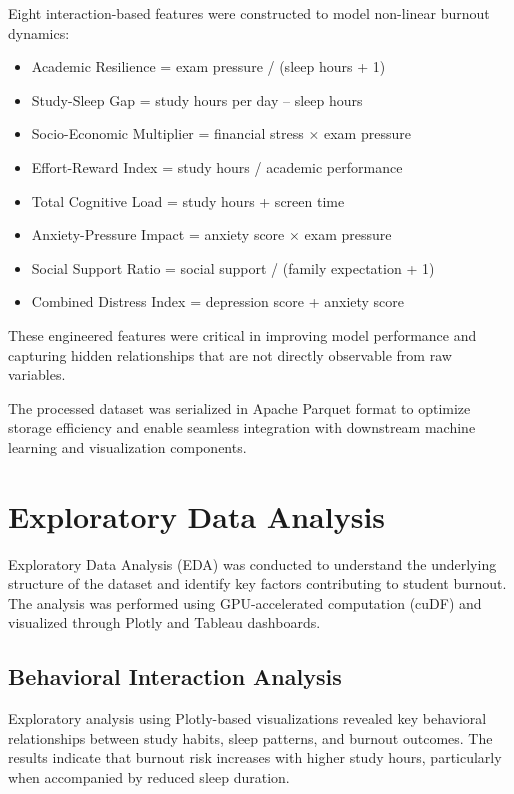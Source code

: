 \documentclass[conference]{IEEEtran}
\begin{document}
Eight interaction-based features were constructed to model non-linear burnout dynamics:

\begin{itemize}
    \item Academic Resilience = exam pressure / (sleep hours + 1)
    \item Study-Sleep Gap = study hours per day – sleep hours
    \item Socio-Economic Multiplier = financial stress $\times$ exam pressure
    \item Effort-Reward Index = study hours / academic performance
    \item Total Cognitive Load = study hours + screen time
    \item Anxiety-Pressure Impact = anxiety score $\times$ exam pressure
    \item Social Support Ratio = social support / (family expectation + 1)
    \item Combined Distress Index = depression score + anxiety score
\end{itemize}

These engineered features were critical in improving model performance and capturing hidden relationships that are not directly observable from raw variables.

The processed dataset was serialized in Apache Parquet format to optimize storage efficiency and enable seamless integration with downstream machine learning and visualization components.

\section{Exploratory Data Analysis}

Exploratory Data Analysis (EDA) was conducted to understand the underlying structure of the dataset and identify key factors contributing to student burnout. The analysis was performed using GPU-accelerated computation (cuDF) and visualized through Plotly and Tableau dashboards.

\subsection{Behavioral Interaction Analysis}

Exploratory analysis using Plotly-based visualizations revealed key behavioral relationships between study habits, sleep patterns, and burnout outcomes. The results indicate that burnout risk increases with higher study hours, particularly when accompanied by reduced sleep duration.
\end{document}
